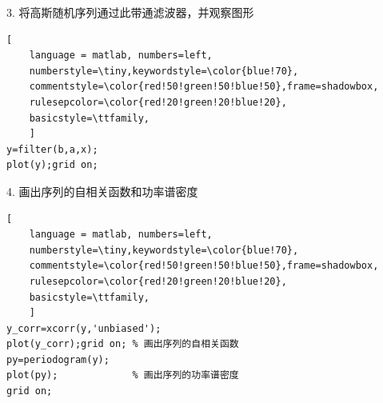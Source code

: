 \documentclass[UTF-8, a4paper, 12pt]{ctexart}
\begin{document}
3. 将高斯随机序列通过此带通滤波器，并观察图形
\begin{lstlisting}[
	language = matlab, numbers=left, 
	numberstyle=\tiny,keywordstyle=\color{blue!70},
	commentstyle=\color{red!50!green!50!blue!50},frame=shadowbox,
	rulesepcolor=\color{red!20!green!20!blue!20},
	basicstyle=\ttfamily,
	]
y=filter(b,a,x);
plot(y);grid on;
\end{lstlisting}

4. 画出序列的自相关函数和功率谱密度
\begin{lstlisting}[
	language = matlab, numbers=left, 
	numberstyle=\tiny,keywordstyle=\color{blue!70},
	commentstyle=\color{red!50!green!50!blue!50},frame=shadowbox,
	rulesepcolor=\color{red!20!green!20!blue!20},
	basicstyle=\ttfamily,
	]
y_corr=xcorr(y,'unbiased');
plot(y_corr);grid on; % 画出序列的自相关函数
py=periodogram(y);
plot(py);             % 画出序列的功率谱密度
grid on;
\end{lstlisting}
\end{document}
